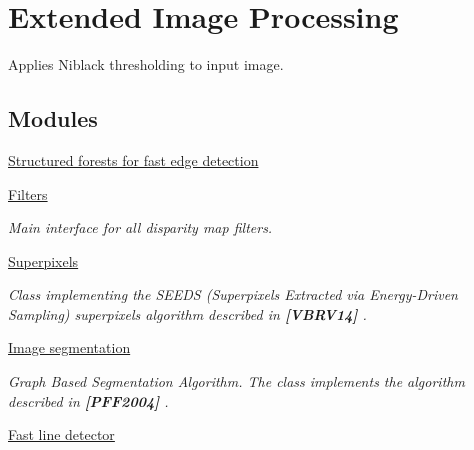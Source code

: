 \hypertarget{group__ximgproc}{}\section{Extended Image Processing}
\label{group__ximgproc}


Applies Niblack thresholding to input image.  


\subsection*{Modules}
\begin{DoxyCompactItemize}
\item 
\hyperlink{group__ximgproc__edge}{Structured forests for fast edge detection}
\item 
\hyperlink{group__ximgproc__filters}{Filters}
\begin{DoxyCompactList}\small\item\em Main interface for all disparity map filters. \end{DoxyCompactList}\item 
\hyperlink{group__ximgproc__superpixel}{Superpixels}
\begin{DoxyCompactList}\small\item\em Class implementing the S\+E\+E\+DS (Superpixels Extracted via Energy-\/\+Driven Sampling) superpixels algorithm described in {\bfseries [V\+B\+R\+V14]} . \end{DoxyCompactList}\item 
\hyperlink{group__ximgproc__segmentation}{Image segmentation}
\begin{DoxyCompactList}\small\item\em Graph Based Segmentation Algorithm. The class implements the algorithm described in {\bfseries [P\+F\+F2004]} . \end{DoxyCompactList}\item 
\hyperlink{group__ximgproc__fast__line__detector}{Fast line detector}
\end{DoxyCompactItemize}
